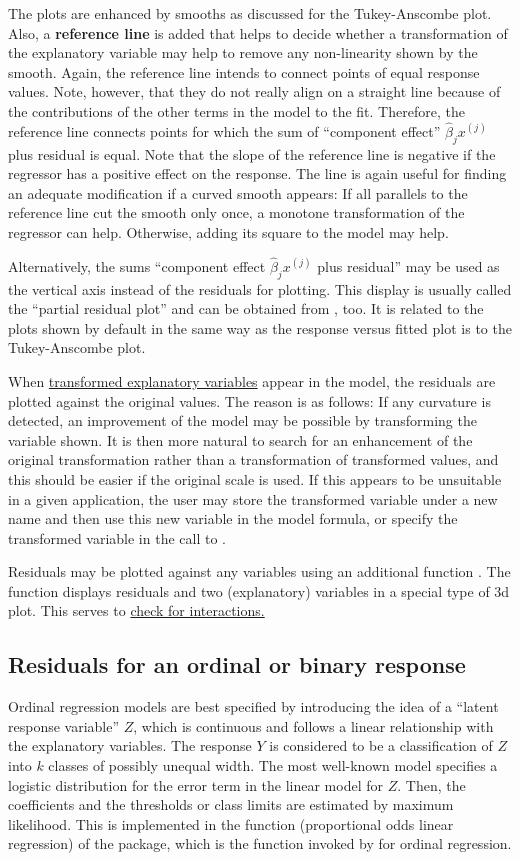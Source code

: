 \documentclass[11pt]{article}
\begin{document}
The plots are enhanced by smooths as discussed for the Tukey-Anscombe
plot. 
Also, a \textbf{reference line} is added that helps to decide whether a
transformation of the explanatory variable may help to remove any
non-linearity shown by the smooth.
Again, the reference line intends to connect points of equal response
values. Note, however, that they do not really align on a straight line
because of the contributions of the other terms in the model to the fit.
Therefore, the reference line connects points for which the sum of 
``component effect'' $\widehat\beta_j x^{(j)}$ plus residual is equal.
Note that the slope of the reference line is negative if the regressor has
a positive effect on the response.
The line is again useful for finding an adequate modification if a curved
smooth appears: If all parallels to the reference line cut the smooth only
once, a monotone transformation of the regressor can help. 
Otherwise, adding its square to the model may help.

Alternatively, the sums 
``component effect $\widehat\beta_j x^{(j)}$ plus residual''
may be used as the vertical axis instead of the
residuals for plotting. This display is usually called the 
``partial residual plot'' and can be obtained from , too. 
It is related to the plots shown by default in the same way as the
response versus fitted plot is to the Tukey-Anscombe plot.

When \ul{transformed explanatory variables} appear in the model, the
residuals are plotted against the original values. The reason is as
follows: If any curvature is detected, an improvement of the model may be
possible by transforming the variable shown. It is then more natural
to search for an enhancement of the original transformation rather than 
a transformation of transformed values, and this should be easier if 
the original scale is used.
If this appears to be unsuitable in a given application, the user
may store the transformed variable under a new name and then use 
this new variable in the model formula, or specify the transformed 
variable in the call to .

Residuals may be plotted against any variables using an additional function 
. The function  displays residuals and two
(explanatory) variables in a special type of 3d plot. This serves to 
\ul{check for interactions.}

\subsection{Residuals for an ordinal or binary response}
Ordinal regression models are best specified by introducing the idea of a 
``latent response variable'' $Z$, which is continuous and follows a linear
relationship with the explanatory variables. 
The response $Y$ is considered to be a classification of $Z$ into $k$
classes of possibly unequal width. The most well-known model specifies a 
logistic distribution for the error term in the linear model for $Z$.
Then, the coefficients and the thresholds or class limits are estimated by
maximum likelihood. This is implemented in the function  
(proportional odds linear regression) of the  package, 
which is the function invoked by  for ordinal regression.
\end{document}
